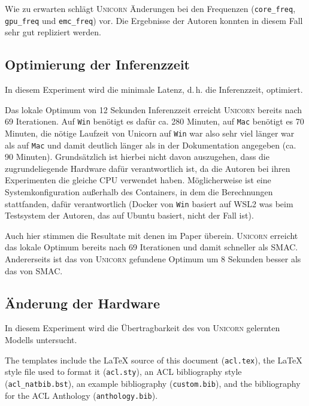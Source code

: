 \documentclass[11pt]{article}
\begin{document}
Wie zu erwarten schlägt \textsc{Unicorn} Änderungen bei den Frequenzen (\texttt{core\_freq}, \texttt{gpu\_freq} und \texttt{emc\_freq}) vor. Die Ergebnisse der Autoren konnten in diesem Fall sehr gut repliziert werden.

\subsection{Optimierung der Inferenzzeit}

In diesem Experiment wird die minimale Latenz, d.\,h. die Inferenzzeit, optimiert.

Das lokale Optimum von 12 Sekunden Inferenzzeit erreicht \textsc{Unicorn} bereits nach 69 Iterationen. Auf \texttt{Win} benötigt es dafür ca. 280 Minuten, auf \texttt{Mac} benötigt es 70 Minuten, die nötige Laufzeit von Unicorn auf \texttt{Win} war also sehr viel länger war als auf \texttt{Mac} und damit deutlich länger als in der Dokumentation angegeben (ca. 90 Minuten). Grundsätzlich ist hierbei nicht davon auszugehen, dass die zugrundeliegende Hardware dafür verantwortlich ist, da die Autoren bei ihren Experimenten die gleiche CPU verwendet haben. Möglicherweise ist eine Systemkonfiguration außerhalb des Containers, in dem die Berechnungen stattfanden, dafür verantwortlich (Docker von \texttt{Win} basiert auf WSL2 was beim Testsystem der Autoren, das auf Ubuntu basiert, nicht der Fall ist).

Auch hier stimmen die Resultate mit denen im Paper überein. \textsc{Unicorn} erreicht das lokale Optimum bereits nach 69 Iterationen und damit schneller als SMAC. Andererseits ist das von \textsc{Unicorn} gefundene Optimum um 8 Sekunden besser als das von SMAC.






\subsection{Änderung der Hardware}

In diesem Experiment wird die Übertragbarkeit des von \textsc{Unicorn} gelernten Modells untersucht.



\newpage
\newpage



The templates include the \LaTeX{} source of this document (\texttt{acl.tex}),
the \LaTeX{} style file used to format it (\texttt{acl.sty}),
an ACL bibliography style (\texttt{acl\_natbib.bst}),
an example bibliography (\texttt{custom.bib}),
and the bibliography for the ACL Anthology (\texttt{anthology.bib}).
\end{document}
